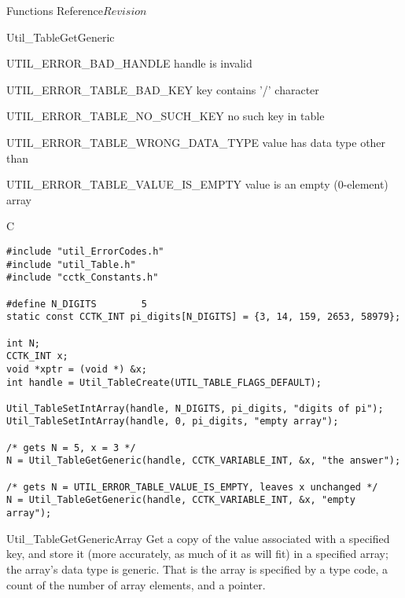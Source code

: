 \begin{cactuspart}{ Functions Reference}{}{$Revision$}
\begin{FunctionDescription}{Util\_TableGetGeneric}
\begin{ErrorSection}
\begin{Error}{UTIL\_ERROR\_BAD\_HANDLE}
handle is invalid
\end{Error}
\begin{Error}{UTIL\_ERROR\_TABLE\_BAD\_KEY}
key contains '/' character
\end{Error}
\begin{Error}{UTIL\_ERROR\_TABLE\_NO\_SUCH\_KEY}
no such key in table
\end{Error}
\begin{Error}{UTIL\_ERROR\_TABLE\_WRONG\_DATA\_TYPE}
value has data type other than 
\end{Error}
\begin{Error}{UTIL\_ERROR\_TABLE\_VALUE\_IS\_EMPTY}
value is an empty (0-element) array
\end{Error}
\end{ErrorSection}

\begin{ExampleSection}
\begin{Example}{C}
\begin{verbatim}
#include "util_ErrorCodes.h"
#include "util_Table.h"
#include "cctk_Constants.h"

#define N_DIGITS        5
static const CCTK_INT pi_digits[N_DIGITS] = {3, 14, 159, 2653, 58979};

int N;
CCTK_INT x;
void *xptr = (void *) &x;
int handle = Util_TableCreate(UTIL_TABLE_FLAGS_DEFAULT);

Util_TableSetIntArray(handle, N_DIGITS, pi_digits, "digits of pi");
Util_TableSetIntArray(handle, 0, pi_digits, "empty array");

/* gets N = 5, x = 3 */
N = Util_TableGetGeneric(handle, CCTK_VARIABLE_INT, &x, "the answer");

/* gets N = UTIL_ERROR_TABLE_VALUE_IS_EMPTY, leaves x unchanged */
N = Util_TableGetGeneric(handle, CCTK_VARIABLE_INT, &x, "empty array");
\end{verbatim}
\end{Example}
\end{ExampleSection}
\end{FunctionDescription}


\begin{FunctionDescription}{Util\_TableGetGenericArray}
\label{Util-TableGetGenericArray}
Get a copy of the value associated with a specified key, and store
it (more accurately, as much of it as will fit) in a specified array;
the array's data type is generic.  That is the array is specified by
a  type code, a count of the number of array
elements, and a  pointer.


\end{FunctionDescription}
\end{cactuspart}

